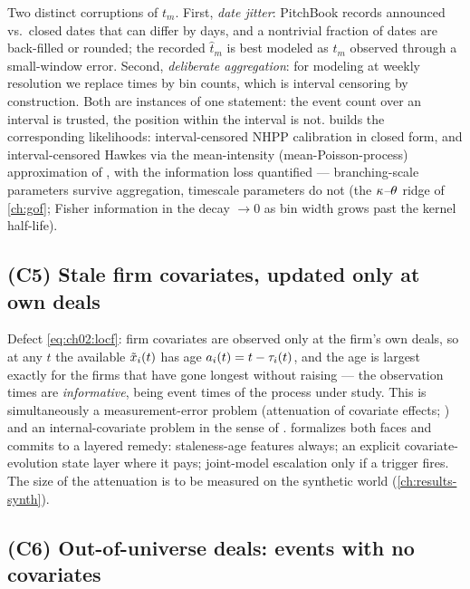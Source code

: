 Two distinct corruptions of $t_m$. First, \emph{date jitter}: PitchBook
records announced vs.\ closed dates that can differ by days, and a
nontrivial fraction of dates are back-filled or rounded; the recorded
$\hat t_m$ is best modeled as $t_m$ observed through a small-window error.
Second, \emph{deliberate aggregation}: for modeling at weekly resolution we
replace times by bin counts, which is interval censoring by construction.
Both are instances of one statement: the event count over an interval is
trusted, the position within the interval is not. 
builds the corresponding likelihoods: interval-censored NHPP calibration
in closed form, and interval-censored Hawkes via the mean-intensity
(mean-Poisson-process) approximation of \citet{rizoiu2022}, with the
information loss quantified --- branching-scale parameters survive
aggregation, timescale parameters do not (the $\kappa$--$\theta$ ridge of
\cref{ch:gof}; Fisher information in the decay $\to 0$ as bin width grows
past the kernel half-life).

\subsection*{(C5) Stale firm covariates, updated only at own deals}

Defect \cref{eq:ch02:locf}: firm covariates are observed only at the
firm's own deals, so at any $t$ the available $\tilde{x}_i(t)$ has age
$a_i(t) = t - \tau_i(t)$, and the age is largest exactly for the
firms that have gone longest without raising --- the observation times are
\emph{informative}, being event times of the process under study. This is
simultaneously a measurement-error problem (attenuation of covariate
effects; \citealp{carroll2006,prentice1982}) and an
internal-covariate problem in the sense of \citet{kalbfleisch2002}.
 formalizes both faces and commits to a layered remedy:
staleness-age features always; an explicit covariate-evolution state layer
where it pays; joint-model escalation
\citep{rizopoulos2012,tsiatisdavidian2004} only if a trigger fires. The
size of the attenuation is to be measured on the synthetic world
(\cref{ch:results-synth}).

\subsection*{(C6) Out-of-universe deals: events with no covariates}


